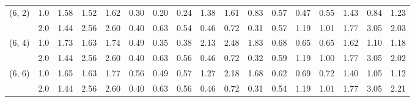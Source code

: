 \begin{tabular}{llrrrrrrrrrrrrrrr}
(6, 2) & 1.0 &   1.58 & 1.52 & 1.62 &    0.30 & 0.20 & 0.24 &    1.38 & 1.61 & 0.83 & 0.57 & 0.47 & 0.55 & 1.43 & 0.84 & 1.23 \\
       & 2.0 &   1.44 & 2.56 & 2.60 &    0.40 & 0.63 & 0.54 &    0.46 & 0.72 & 0.31 & 0.57 & 1.19 & 1.01 & 1.77 & 3.05 & 2.03 \\
(6, 4) & 1.0 &   1.73 & 1.63 & 1.74 &    0.49 & 0.35 & 0.38 &    2.13 & 2.48 & 1.83 & 0.68 & 0.65 & 0.65 & 1.62 & 1.10 & 1.18 \\
       & 2.0 &   1.44 & 2.56 & 2.60 &    0.40 & 0.63 & 0.56 &    0.46 & 0.72 & 0.32 & 0.59 & 1.19 & 1.00 & 1.77 & 3.05 & 2.02 \\
(6, 6) & 1.0 &   1.65 & 1.63 & 1.77 &    0.56 & 0.49 & 0.57 &    1.27 & 2.18 & 1.68 & 0.62 & 0.69 & 0.72 & 1.40 & 1.05 & 1.12 \\
       & 2.0 &   1.44 & 2.56 & 2.60 &    0.40 & 0.63 & 0.56 &    0.46 & 0.72 & 0.31 & 0.54 & 1.19 & 1.01 & 1.77 & 3.05 & 2.21 \\
\bottomrule
\end{tabular}
